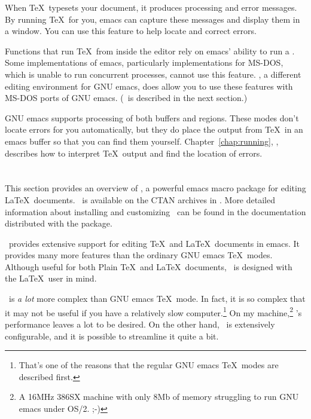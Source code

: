 When \TeX\ typesets your document, it produces processing and error 
messages.  By running 
\TeX\ for you, emacs can
capture these messages and display them in a window.  You can use this
feature to help locate and correct errors.

Functions that run \TeX\ from inside the editor rely on emacs'
ability to run a .  Some
implementations of emacs, particularly implementations for MS-DOS,
which is unable to run concurrent processes, cannot use this
feature.  \auctex, a different editing environment for GNU emacs,
does allow you to use these features with MS-DOS 
ports of GNU
emacs.  (\auctex\ is described in the next section.)

GNU emacs supports processing of both buffers and regions.  These
modes don't locate errors for you automatically, but they do place
the output from \TeX\ in an emacs buffer so that you can find them
yourself.  Chapter~\ref{chap:running}, {\it {}}, describes how to 
interpret \TeX\ output and find the location of errors.

\section{\protect\auctex}
\label{sec:auctex}

This section provides an overview of , a powerful emacs macro package
for editing \LaTeX\ documents.
\auctex\ is available on the
CTAN archives in .
More detailed information about installing and customizing \auctex\
can be found in the documentation distributed with the package.

\auctex\ provides extensive support for editing \TeX\ and \LaTeX\ documents
in emacs.  It provides many more features than the ordinary GNU emacs
\TeX\ modes.  Although useful for both Plain \TeX\ and \LaTeX\ documents,
\auctex\ is designed with the \LaTeX\ user in mind.

\auctex\ is {\em a lot\/} more complex than GNU emacs \TeX\
mode.  In fact, it is so complex that it may not be useful if you have
a relatively slow computer.\footnote{That's one of the reasons that the
regular GNU emacs \TeX\ modes are described first.}  On my
machine,\footnote{A 16MHz 386SX machine with only 8Mb of memory
struggling to run GNU emacs under OS/2. ;-)} \auctex's performance 
leaves a lot to be desired.  On the other hand, \auctex\ is extensively
configurable, and it is possible to streamline it quite a bit.


